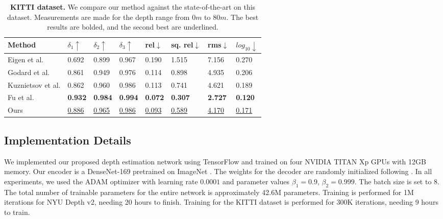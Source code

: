 \documentclass[10pt,twocolumn,letterpaper]{article}
\begin{document}
\begin{table*}[t]
\centering
\begin{tabular}{l|lll|llll}
\toprule
Method         & $\delta_{1}\uparrow$ & $\delta_{2}\uparrow$ & $\delta_{3}\uparrow$ & rel$\downarrow$ & sq. rel$\downarrow$    & rms$\downarrow$   & $log_{10}\downarrow$  \\ 
\midrule
Eigen et al. \cite{Eigen2014}       & 0.692  & 0.899  & 0.967 & 0.190 & 1.515 & 7.156 & 0.270 \\
Godard et al. \cite{Godard2017}      & 0.861  & 0.949  & 0.976 & 0.114 & 0.898 & 4.935  & 0.206 \\
Kuznietsov et al. \cite{Kuznietsov2017}  & 0.862  & 0.960  & 0.986 & 0.113 & 0.741 & 4.621 & 0.189 \\
Fu et al. \cite{Fu2018DeepOR}    & \textbf{0.932}  & \textbf{0.984}  & \textbf{0.994} & \textbf{0.072} & \textbf{0.307} & \textbf{2.727}  & \textbf{0.120} \\
Ours                             & \underline{0.886}  & \underline{0.965}  & \underline{0.986} & \underline{0.093} & \underline{0.589} & \underline{4.170} & \underline{0.171} \\
\bottomrule
\end{tabular}
\bigskip
\caption{\textbf{KITTI dataset.} We compare our method against the state-of-the-art on this dataset. Measurements are made for the depth range from $0m$ to $80m$. The best results are bolded, and the second best are underlined.}
\label{tab:kitti}
\end{table*}



\subsection{Implementation Details} 

We implemented our proposed depth estimation network using TensorFlow \cite{tensorflow2015-whitepaper} and trained on four NVIDIA TITAN Xp GPUs with 12GB memory. Our encoder is a DenseNet-169 \cite{huang2017densely} pretrained on ImageNet \cite{Deng2009}. The weights for the decoder are randomly initialized following \cite{glorot2010understanding}. In all experiments, we used the ADAM \cite{jlb2015adam} optimizer with learning rate $0.0001$ and parameter values $\beta_1=0.9$, $\beta_2=0.999$. The batch size is set to 8. The total number of trainable parameters for the entire network is approximately 42.6M parameters. Training is performed for 1M iterations for NYU Depth v2, needing 20 hours to finish. Training for the KITTI dataset is performed for 300K iterations, needing 9 hours to train.
\end{document}
